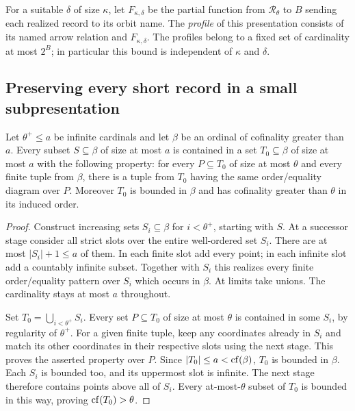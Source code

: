 For a suitable $\delta$ of size $\kappa$, let $F_{\kappa,\delta}$
be the partial function from $\mathcal R_\theta$ to $B$ sending
each realized record to its orbit name. The \emph{profile}
of this presentation consists of its named arrow relation
and $F_{\kappa,\delta}$. The profiles belong to a fixed set
of cardinality at most $2^B$; in particular this bound is
independent of $\kappa$ and $\delta$.

\subsection{Preserving every short record in a small subpresentation}

\begin{lemma}
\label{found:ordinal-support-closure}
Let $\theta^+\leq a$ be infinite cardinals and let $\beta$ be
an ordinal of cofinality greater than $a$. Every subset
$S\subseteq\beta$ of size at most $a$ is contained in a set
$T_0\subseteq\beta$ of size at most $a$ with the following
property: for every $P\subseteq T_0$ of size at most $\theta$
and every finite tuple from $\beta$, there is a tuple from
$T_0$ having the same order/equality diagram over $P$.
Moreover $T_0$ is bounded in $\beta$ and has cofinality
greater than $\theta$ in its induced order.
\end{lemma}

\begin{proof}
Construct increasing sets $S_i\subseteq\beta$ for $i<\theta^+$,
starting with $S$. At a successor stage consider all strict
slots over the entire well-ordered set $S_i$. There are at
most $|S_i|+1\leq a$ of them. In each finite slot add every
point; in each infinite slot add a countably infinite subset.
Together with $S_i$ this realizes every finite order/equality
pattern over $S_i$ which occurs in $\beta$. At limits take
unions. The cardinality stays at most $a$ throughout.

Set $T_0=\bigcup_{i<\theta^+}S_i$. Every set
$P\subseteq T_0$ of size at most $\theta$ is contained in
some $S_i$, by regularity of $\theta^+$. For a given finite
tuple, keep any coordinates already in $S_i$ and match its
other coordinates in their respective slots using the next
stage. This proves the asserted property over $P$.
Since $|T_0|\leq a<\operatorname{cf}(\beta)$, $T_0$ is bounded in
$\beta$. Each $S_i$ is bounded too, and its uppermost slot
is infinite. The next stage therefore contains points above
all of $S_i$. Every at-most-$\theta$ subset of $T_0$ is
bounded in this way, proving $\operatorname{cf}(T_0)>\theta$.
\end{proof}

